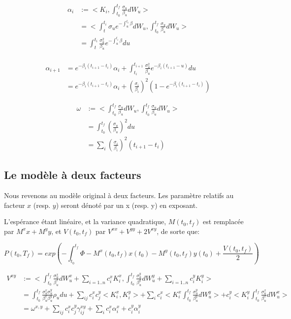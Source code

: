 \begin{align*}
\alpha_i &:=
<K_i, \int_{t_0}^{t_f} \frac{\sigma_u}{\beta_u} dW_u> \\
&=
< \int_{t}^{t_i}\sigma_u e^{-\int_u^{t_i} \beta} dW_u,
\int_{t_0}^{t_f} \frac{\sigma_u}{\beta_u} dW_u > \\
&=   \int_t^{t_i} \frac{\sigma_u^2}{\beta_u} e^{-\int_u^{t_i} \beta} du \\
\end{align*}

\begin{align*}
\alpha_{i+1}
&= e^{-\beta_i (t_{i+1} - t_i)} \alpha_i + \int_{t_i}^{t_{i+1}} \frac{\sigma_u^2}{\beta_u} e^{-\beta_i(t_{i+1} - u)} du\\
&= e^{-\beta_i (t_{i+1} - t_i)} \alpha_i + (\frac{\sigma_i}{\beta_i})^2 (1 - e^{-\beta_i(t_{i+1} - t_i)})
\end{align*}


\begin{align*}
\omega &:=
<\int_{t_0}^{t_f} \frac{\sigma_u}{\beta_u} dW_u, \int_{t_0}^{t_f} \frac{\sigma_u}{\beta_u} dW_u>\\
&= \int_{t_0}^{t_f} (\frac{\sigma_u}{\beta_u})^2 du \\
&= \sum_i  (\frac{\sigma_i}{\beta_i})^2 (t_{i+1} - t_i)
\end{align*}

\subsection*{Le modèle à deux facteurs}
Nous revenons au modèle original à deux facteurs. Les paramètre relatifs au facteur $x$ (resp. $y$) seront dénoté par un x (resp. y) en exposant.

L'espérance étant linéaire, et la variance quadratique, 
$M(t_0, t_f)$ est remplacée par $M^x x + M^y y$, et $V(t_0, t_f)$ par $V^{xx} + V^{yy} + 2 V^{xy}$, de sorte que:

$$P(t_0, T_f) = exp(-\int_{t_0}^{t_f} \Phi - M^x(t_0, t_f) x(t_0) - M^y(t_0, t_f) y(t_0) + \frac{V(t_0, t_f)}{2})$$

\begin{align*} V^{xy} &:= <
\int_{t_0}^{t_f} \frac{\sigma^x_u}{\beta_u^x} dW_u^x+\sum_{i=1..n}c_i^x K_i^x,
\int_{t_0}^{t_f} \frac{\sigma^y_u}{\beta_u^y} dW_u^y+\sum_{i=1..n}c_i^y K_i^y> \\
&= \int_{t_0}^{t_f} \frac{\sigma_u^x \sigma_u^y}{\beta_u^x \beta_u^y} \rho_u du
+ \sum_{ij} c_i^x c_j^y <K_i^x, K_i^y>
+ \sum_i c_i^x <K_i^x \int_{t_0}^{t_f} \frac{\sigma^y_u}{\beta_u^y} dW_u^y> + c_i^y <K_i^y \int_{t_0}^{t_f} \frac{\sigma^x_u}{\beta_u^x} dW_u^x>\\
&= \omega^{x,y} + \sum_{ij} c_i^x c_j^y \gamma_{ij}^{xy}
+ \sum_i c_i^x \alpha_i^x + c_i^y \alpha_i^y
\end{align*}

